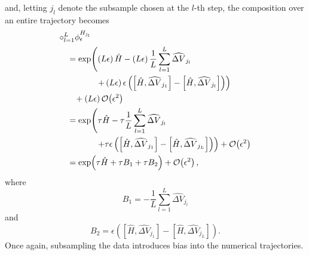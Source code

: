 \documentclass{article}
\begin{document}
%
and, letting $j_{l}$ denote the subsample chosen at the $l$-th step, the composition over
an entire trajectory becomes
%
\begin{align*}
\circ_{l = 1}^{L} \phi^{H_{j_{l}}}_{\epsilon}
& \\
& \hspace{-10mm} =
\exp \! \left( 
\left( L \epsilon \right) \hat{H} 
- \left( L \epsilon \right) \frac{1}{L} \sum_{l = 1}^{L}  \widehat{ \Delta V}_{j_{l}}
\right.
\\
& \hspace{2mm} \left.
+ \left( L \epsilon \right) \epsilon 
\left( \left[ \hat{H}, \widehat{ \Delta V}_{j_{1}} \right] 
- \left[ \hat{H}, \widehat{ \Delta V}_{j_{l}} \right] \right) 
\right)
\\
& \hspace{-7mm}
+ \left(L \epsilon \right) \mathcal{O} \! \left( \epsilon^{2} \right)
\\
& \hspace{-10mm} =
\exp \! \left( \tau \hat{H} - \tau \frac{1}{L} \sum_{l = 1}^{L} \widehat{ \Delta V}_{j_{l}}
\right.
\\
& \hspace{2mm} \left.
+ \tau \epsilon 
\left( \left[ \hat{H}, \widehat{ \Delta V}_{j_{1}} \right] 
- \left[ \hat{H}, \widehat{ \Delta V}_{j_{L}} \right] \right)
\right)
+ \mathcal{O} \! \left( \epsilon^{2} \right)
\\
& \hspace{-10mm} =
\exp \! \left( \tau \hat{H} + \tau B_{1} + \tau B_{2} \right)
+ \mathcal{O} \! \left( \epsilon^{2} \right),
\end{align*}
%
where
%
\begin{equation*}
B_{1} = - \frac{1}{L} \sum_{l = 1}^{L} \widehat{ \Delta V}_{j_{l}}
\end{equation*}
%
and
%
\begin{equation*}
B_{2} = \epsilon 
\left( \left[ \hat{H}, \widehat{ \Delta V}_{j_{1}} \right] 
- \left[ \hat{H}, \widehat{ \Delta V}_{j_{L}} \right] \right).
\end{equation*}
%
Once again, subsampling the data introduces bias into the numerical trajectories.
\end{document}
